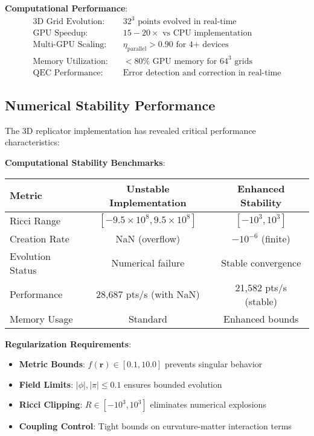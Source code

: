 \documentclass[11pt]{article}
\begin{document}
\textbf{Computational Performance}:
\begin{align}
\text{3D Grid Evolution:} &\quad 32^3 \text{ points evolved in real-time} \\
\text{GPU Speedup:} &\quad 15-20× \text{ vs CPU implementation} \\
\text{Multi-GPU Scaling:} &\quad \eta_{\text{parallel}} > 0.90 \text{ for 4+ devices} \\
\text{Memory Utilization:} &\quad <80\% \text{ GPU memory for } 64^3 \text{ grids} \\
\text{QEC Performance:} &\quad \text{Error detection and correction in real-time}
\end{align}

\subsection*{Numerical Stability Performance}

The 3D replicator implementation has revealed critical performance characteristics:

\textbf{Computational Stability Benchmarks}:
\begin{center}
\begin{tabular}{|l|c|c|}
\hline
\textbf{Metric} & \textbf{Unstable Implementation} & \textbf{Enhanced Stability} \\
\hline
Ricci Range & $[-9.5 \times 10^8, 9.5 \times 10^8]$ & $[-10^3, 10^3]$ \\
Creation Rate & NaN (overflow) & $-10^{-6}$ (finite) \\
Evolution Status & Numerical failure & Stable convergence \\
Performance & 28,687 pts/s (with NaN) & 21,582 pts/s (stable) \\
Memory Usage & Standard & Enhanced bounds \\
\hline
\end{tabular}
\end{center}

\textbf{Regularization Requirements}:
\begin{itemize}
\item \textbf{Metric Bounds}: $f(\mathbf{r}) \in [0.1, 10.0]$ prevents singular behavior
\item \textbf{Field Limits}: $|\phi|, |\pi| \leq 0.1$ ensures bounded evolution  
\item \textbf{Ricci Clipping}: $R \in [-10^3, 10^3]$ eliminates numerical explosions
\item \textbf{Coupling Control}: Tight bounds on curvature-matter interaction terms
\end{itemize}
\end{document}
